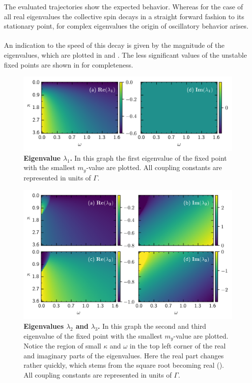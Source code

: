 The evaluated trajectories show the expected behavior. Whereas for the case of all real eigenvalues the collective spin decays in a straight forward fashion to its stationary point, for complex eigenvalues the origin of oscillatory behavior arises. %
\\\\An indication to the speed of this decay is given by the magnitude of the eigenvalues, which are plotted in  and . The less significant values of the unstable fixed points are shown in  for completeness.
\begin{figure}[H]
    \centering
    \includegraphics{pictures/lam_anal_s_1.png}
    \caption{\textbf{Eigenvalue $\lambda_1$.} In this graph the first eigenvalue of the fixed point with the smallest $m_y$-value are plotted. All coupling constants are represented in units of $\Gamma$.}
    \label{fig:eig_value_stab1}
\end{figure}
\begin{figure}[H]
    \centering
    \includegraphics{pictures/lam_anal_s_3.png}
    \caption{\textbf{Eigenvalues $\lambda_2$ and $\lambda_3$.} In this graph the second and third eigenvalue of the fixed point with the smallest $m_y$-value are plotted. Notice the region of small $\kappa$ and $\omega$ in the top left corner of the real and imaginary parts of the eigenvalues. Here the real part changes rather quickly, which stems from the square root becoming real (). All coupling constants are represented in units of $\Gamma$.
    }
    \label{fig:eig_value_stab2}
\end{figure}
